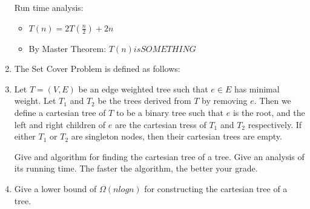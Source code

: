 \documentclass[12pt]{article}
\begin{document}
\begin{enumerate}
    Run time analysis:
    \begin{itemize}
        \item $T(n) = 2T(\frac{n}{2}) + 2n$
        \item By Master Theorem: $T(n) is SOMETHING$
    \end{itemize}

\item The Set Cover Problem is defined as follows:

\item Let $T = (V,E)$ be an edge weighted tree such that $e \in E$ has minimal
    weight.  Let $T_1$ and $T_2$ be the trees derived from $T$ by removing $e$.
    Then we define a cartesian tree of $T$ to be a binary tree such that $e$ is
    the root, and the left and right children of $e$ are the cartesian tress of
    $T_1$ and $T_2$ respectively. If either $T_1$ or $T_2$ are singleton nodes,
    then their cartesian trees are empty.

    Give and algorithm for finding the cartesian tree of a tree. Give an
    analysis of its running time. The faster the algorithm, the better your
    grade.

\item Give a lower bound of $\Omega(nlogn)$ for constructing the cartesian tree
    of a tree.

\end{enumerate}
\end{document}
